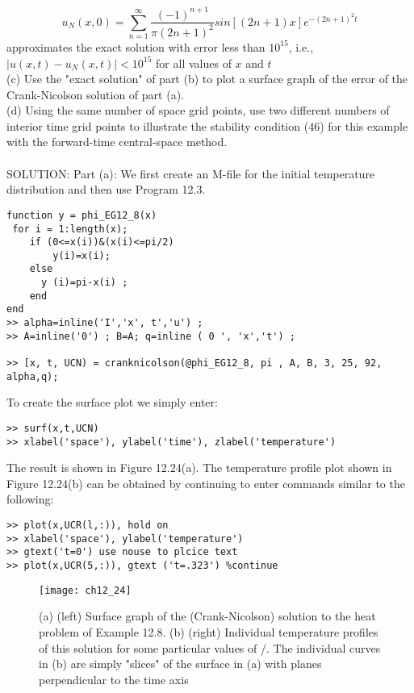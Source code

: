 \documentclass[../main.tex]{subfiles}
\begin{document}
$$
u_N(x,0) = \sum_{n=1}^{\infty}\dfrac{(-1)^{n+1}}{\pi(2n+1)^2} sin[(2n+1)x]e^{-(2n+1)^2t}
$$
approximates the exact solution with error less than $10^15$, i.e., $\vert u(x,t)-u_N(x,t) \vert < 10^15$ for all values of $x$ and $t$
\\
(c) Use the "exact solution" of part (b) to plot a surface graph of the error of the Crank-Nicolson solution of part (a). 
\\
(d) Using the same number of space grid points, use two different numbers of interior time grid points to illustrate the stability condition (46) for this example with the forward-time central-space method. 
\\
\\
SOLUTION: Part (a): We first create an M-file for the initial temperature distribution and then use Program 12.3. 

\begin{lstlisting}[numbers=none,frame=none]
function y = phi_EG12_8(x) 
 for i = 1:length(x); 
	if (0<=x(i))&(x(i)<=pi/2) 
		y(i)=x(i); 
	else 
	  y (i)=pi-x(i) ; 
	end 
end 
>> alpha=inline('I','x', t','u') ; 
>> A=inline('0') ; B=A; q=inline ( 0 ', 'x','t') ;
 
>> [x, t, UCN) = cranknicolson(@phi_EG12_8, pi , A, B, 3, 25, 92, 
alpha,q); 
\end{lstlisting}
To create the surface plot we simply enter: 
\begin{lstlisting}[numbers=none,frame=none]
>> surf(x,t,UCN) 
>> xlabel('space'), ylabel('time'), zlabel('temperature')
\end{lstlisting}
The result is shown in Figure 12.24(a). The temperature profile plot shown in Figure 12.24(b) can be obtained by continuing to enter commands similar to the following:
\begin{lstlisting}[numbers=none,frame=none]
>> plot(x,UCR(l,:)), hold on 
>> xlabel('space'), ylabel('temperature') 
>> gtext('t=0') use nouse to plcice text 
>> plot(x,UCR(5,:)), gtext ('t=.323') %continue 
\end{lstlisting}

\begin{figure}[H]
	\centering
	\texttt{[image: ch12\_24]}
	\caption{\textsf{(a) (left) Surface graph of the (Crank-Nicolson) solution to the heat problem of Example 12.8. (b) (right) Individual temperature profiles of this solution for some particular values of /. The individual curves in (b) are simply "slices" of the surface in (a) with planes perpendicular to the time axis}}
	\label{pfig:ch12_24}
\end{figure}
\end{document}
